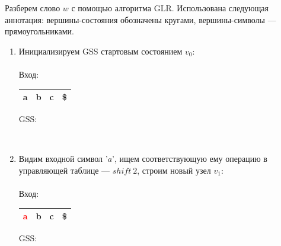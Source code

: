 \begin{example}
    Разберем слово $w$ с помощью алгоритма GLR. Использована следующая аннотация: вершины-состояния обозначены кругами, вершины-символы --- прямоугольниками.
    \begin{enumerate}
        \item Инициализируем GSS стартовым состоянием $v_0$: \\ \\
        Вход: \,
        \begin{tabular}[c]{ |c|c|c|c| } 
            \hline a & b & c & \$ \\ \hline
        \end{tabular}
        \qquad GSS: \,
        \\
        
        \item Видим входной символ '$a$', ищем соответствующую ему операцию в управляющей таблице --- $shift\ 2$, строим новый узел $v_1$: \\ \\
        Вход: \,
        \begin{tabular}[c]{ |c|c|c|c| } 
            \hline \textcolor{red}{a} & b & c & \$ \\ \hline
        \end{tabular}
        \qquad GSS: \,
        \begin{tikzpicture}[x=0.5pt,y=0.5pt,yscale=-1,xscale=1]
        

\end{tikzpicture}
\end{enumerate}
\end{example}

